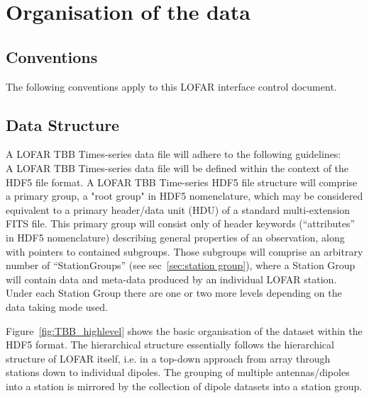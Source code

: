 \documentclass[a4paper,10pt,bibtotoc]{scrartcl}
\begin{document}

\clearpage

\section{Organisation of the data}
\label{sec:structure}



\subsection{Conventions}
The following conventions apply to this LOFAR interface control document.






\subsection{Data Structure}

A LOFAR TBB Times-series data file will adhere to the following guidelines:\\

A LOFAR TBB Times-series data file will be defined within the context
of the HDF5 file format.  A LOFAR TBB Time-series HDF5 file structure
will comprise a primary group, a "root group" in HDF5 nomenclature,
which may be considered equivalent to a primary header/data unit (HDU)
of a standard multi-extension FITS file.  This primary group will
consist only of header keywords (“attributes” in HDF5 nomenclature)
describing general properties of an observation, along with pointers
to contained subgroups.  Those subgroups will comprise an arbitrary
number of ``StationGroups'' (see sec~\ref{sec:station group}), where a
Station Group will contain data and meta-data produced by an
individual LOFAR station. Under each Station Group there are one or two more levels
depending on the data taking mode used.

Figure~\ref{fig:TBB_highlevel} shows the basic organisation of the dataset within
the HDF5 format. The hierarchical structure essentially follows the
hierarchical structure of LOFAR itself, i.e. in a top-down approach
from array through stations down to individual dipoles. The grouping
of multiple antennas/dipoles into a station is mirrored by the
collection of dipole datasets into a station group.
\end{document}
